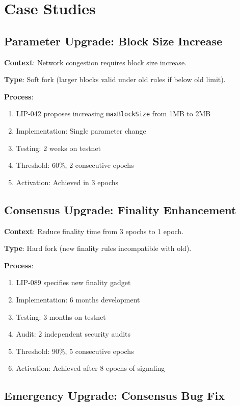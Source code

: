 \documentclass[11pt,a4paper]{article}
\theoremstyle{definition}
\theoremstyle{remark}
\begin{document}
\section{Case Studies}

\subsection{Parameter Upgrade: Block Size Increase}

\textbf{Context}: Network congestion requires block size increase.

\textbf{Type}: Soft fork (larger blocks valid under old rules if below old limit).

\textbf{Process}:
\begin{enumerate}
    \item LIP-042 proposes increasing \texttt{maxBlockSize} from 1MB to 2MB
    \item Implementation: Single parameter change
    \item Testing: 2 weeks on testnet
    \item Threshold: 60\%, 2 consecutive epochs
    \item Activation: Achieved in 3 epochs
\end{enumerate}

\subsection{Consensus Upgrade: Finality Enhancement}

\textbf{Context}: Reduce finality time from 3 epochs to 1 epoch.

\textbf{Type}: Hard fork (new finality rules incompatible with old).

\textbf{Process}:
\begin{enumerate}
    \item LIP-089 specifies new finality gadget
    \item Implementation: 6 months development
    \item Testing: 3 months on testnet
    \item Audit: 2 independent security audits
    \item Threshold: 90\%, 5 consecutive epochs
    \item Activation: Achieved after 8 epochs of signaling
\end{enumerate}

\subsection{Emergency Upgrade: Consensus Bug Fix}
\end{document}
